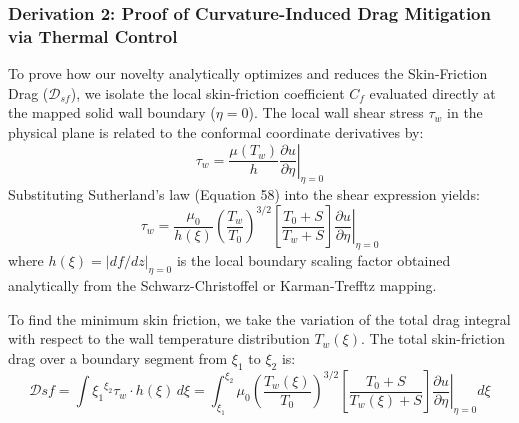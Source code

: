 \documentclass[12pt,a4paper]{article}
\begin{document}
\subsubsection{Derivation 2: Proof of Curvature-Induced Drag Mitigation via Thermal Control}
To prove how our novelty analytically optimizes and reduces the Skin-Friction Drag ($\mathcal{D}_{sf}$), we isolate the local skin-friction coefficient $C_f$ evaluated directly at the mapped solid wall boundary ($\eta = 0$). The local wall shear stress $\tau_w$ in the physical plane is related to the conformal coordinate derivatives by:
\begin{equation}
    \tau_w = \left. \frac{\mu(T_w)}{h} \frac{\partial u}{\partial \eta} \right|_{\eta = 0}
\end{equation}
Substituting Sutherland's law (Equation 58) into the shear expression yields:
\begin{equation}
    \tau_w = \frac{\mu_0}{h(\xi)} \left( \frac{T_w}{T_0} \right)^{3/2} \left[ \frac{T_0 + S}{T_w + S} \right] \left. \frac{\partial u}{\partial \eta} \right|_{\eta = 0}
\end{equation}
where $h(\xi) = |df/dz|_{\eta=0}$ is the local boundary scaling factor obtained analytically from the Schwarz-Christoffel or Karman-Trefftz mapping.

To find the minimum skin friction, we take the variation of the total drag integral with respect to the wall temperature distribution $T_w(\xi)$. The total skin-friction drag over a boundary segment from $\xi_1$ to $\xi_2$ is:
\begin{equation}
    \mathcal{D}{sf} = \int{\xi_1}^{\xi_2} \tau_w \cdot h(\xi) \, d\xi = \int_{\xi_1}^{\xi_2} \mu_0 \left( \frac{T_w(\xi)}{T_0} \right)^{3/2} \left[ \frac{T_0 + S}{T_w(\xi) + S} \right] \left. \frac{\partial u}{\partial \eta} \right|_{\eta = 0} d\xi
\end{equation}
\end{document}
